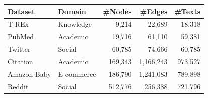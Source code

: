 \begin{tabular}{llrrr}
\toprule
\textbf{Dataset} & \textbf{Domain} & \textbf{\#Nodes} & \textbf{\#Edges} & \textbf{\#Texts}\\
\midrule
T-REx           & Knowledge   & 9,214    & 22,689      & 18,318\\
PubMed          & Academic    & 19,716   & 61,110      & 59,381\\
Twitter         & Social      & 60,785   & 74,666      & 60,785\\
Citation        & Academic    & 169,343  & 1,166,243   & 973,527\\
Amazon-Baby     & E-commerce  & 186,790  & 1,241,083   & 789,898\\
Reddit          & Social      & 512,776  & 256,388     & 721,796\\
\bottomrule
\end{tabular}
